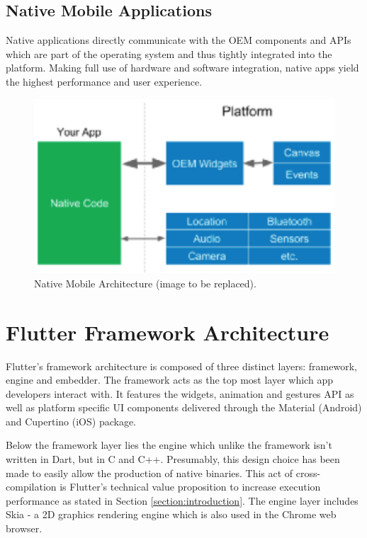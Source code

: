 \subsection{Native Mobile Applications}
Native applications directly communicate with the OEM components and APIs which are part of the operating system and thus tightly integrated into the platform.
Making full use of hardware and software integration, native apps yield the highest performance and user experience.

\begin{figure}
    \includegraphics[width=\linewidth]{images/architectures/native_architecture.eps}
    \caption{Native Mobile Architecture (image to be replaced).}
    \label{fig:native_architecture}
\end{figure}

\section{Flutter Framework Architecture} \label{section::flutter_architecture}
Flutter's framework architecture is composed of three distinct layers: framework, engine and embedder. The framework acts as the top most layer which 
app developers interact with. It features the widgets, animation and gestures API as well as platform specific UI components delivered through
the Material (Android) and Cupertino (iOS) package.

Below the framework layer lies the engine which unlike the framework isn't written in Dart, but in C and C++. Presumably, this design choice has been 
made to easily allow the production of native binaries. This act of cross-compilation is Flutter's technical value proposition to increase execution performance as stated in 
Section \ref{section:introduction}. The engine layer includes Skia - a 2D graphics rendering engine which is also used in the Chrome web browser.

